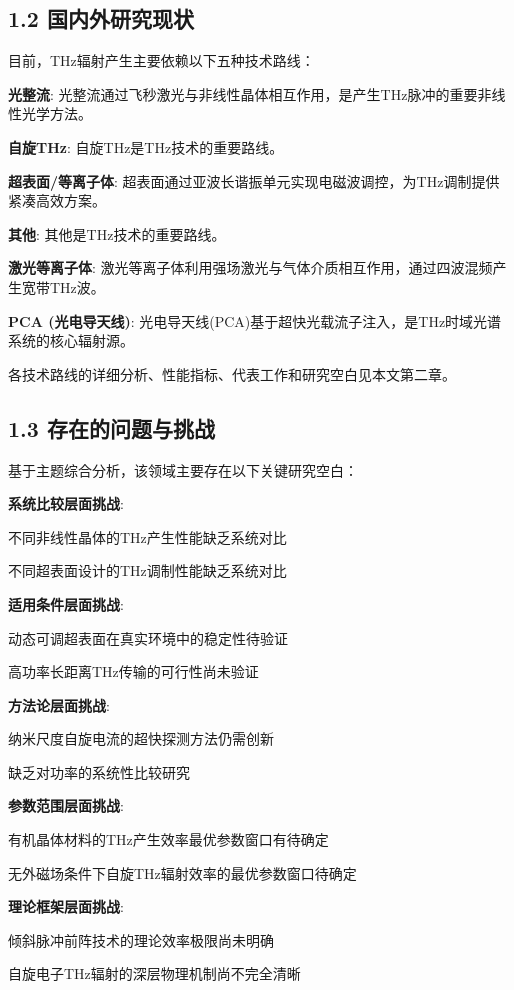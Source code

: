 \documentclass[12pt]{article}
\begin{document}
\subsection{1.2 国内外研究现状}

目前，THz辐射产生主要依赖以下五种技术路线：
\item \textbf{光整流}: 光整流通过飞秒激光与非线性晶体相互作用，是产生THz脉冲的重要非线性光学方法。
\item \textbf{自旋THz}: 自旋THz是THz技术的重要路线。
\item \textbf{超表面/等离子体}: 超表面通过亚波长谐振单元实现电磁波调控，为THz调制提供紧凑高效方案。
\item \textbf{其他}: 其他是THz技术的重要路线。
\item \textbf{激光等离子体}: 激光等离子体利用强场激光与气体介质相互作用，通过四波混频产生宽带THz波。
\item \textbf{PCA (光电导天线)}: 光电导天线(PCA)基于超快光载流子注入，是THz时域光谱系统的核心辐射源。

各技术路线的详细分析、性能指标、代表工作和研究空白见本文第二章。

\subsection{1.3 存在的问题与挑战}

基于主题综合分析，该领域主要存在以下关键研究空白：

\textbf{系统比较层面挑战}:
\item 不同非线性晶体的THz产生性能缺乏系统对比
\item 不同超表面设计的THz调制性能缺乏系统对比

\textbf{适用条件层面挑战}:
\item 动态可调超表面在真实环境中的稳定性待验证
\item 高功率长距离THz传输的可行性尚未验证

\textbf{方法论层面挑战}:
\item 纳米尺度自旋电流的超快探测方法仍需创新
\item 缺乏对功率的系统性比较研究

\textbf{参数范围层面挑战}:
\item 有机晶体材料的THz产生效率最优参数窗口有待确定
\item 无外磁场条件下自旋THz辐射效率的最优参数窗口待确定

\textbf{理论框架层面挑战}:
\item 倾斜脉冲前阵技术的理论效率极限尚未明确
\item 自旋电子THz辐射的深层物理机制尚不完全清晰
\end{document}
